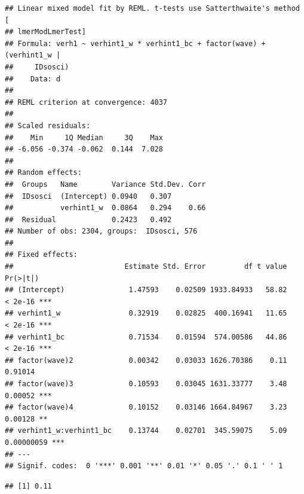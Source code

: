 \documentclass[
]{book}
\newenvironment{Shaded}{\begin{snugshade}}{\end{snugshade}}
\newcommand{\CommentTok}[1]{\textcolor[rgb]{0.56,0.35,0.01}{\textit{#1}}}
\newcommand{\DecValTok}[1]{\textcolor[rgb]{0.00,0.00,0.81}{#1}}
\newcommand{\KeywordTok}[1]{\textcolor[rgb]{0.13,0.29,0.53}{\textbf{#1}}}
\newcommand{\NormalTok}[1]{#1}
\newcommand{\OperatorTok}[1]{\textcolor[rgb]{0.81,0.36,0.00}{\textbf{#1}}}
\newcommand{\StringTok}[1]{\textcolor[rgb]{0.31,0.60,0.02}{#1}}
\begin{document}
\begin{verbatim}
## Linear mixed model fit by REML. t-tests use Satterthwaite's method [
## lmerModLmerTest]
## Formula: verh1 ~ verhint1_w * verhint1_bc + factor(wave) + (verhint1_w |  
##     IDsosci)
##    Data: d
## 
## REML criterion at convergence: 4037
## 
## Scaled residuals: 
##    Min     1Q Median     3Q    Max 
## -6.056 -0.374 -0.062  0.144  7.028 
## 
## Random effects:
##  Groups   Name        Variance Std.Dev. Corr
##  IDsosci  (Intercept) 0.0940   0.307        
##           verhint1_w  0.0864   0.294    0.66
##  Residual             0.2423   0.492        
## Number of obs: 2304, groups:  IDsosci, 576
## 
## Fixed effects:
##                          Estimate Std. Error         df t value   Pr(>|t|)    
## (Intercept)               1.47593    0.02509 1933.84933   58.82    < 2e-16 ***
## verhint1_w                0.32919    0.02825  400.16941   11.65    < 2e-16 ***
## verhint1_bc               0.71534    0.01594  574.00586   44.86    < 2e-16 ***
## factor(wave)2             0.00342    0.03033 1626.70386    0.11    0.91014    
## factor(wave)3             0.10593    0.03045 1631.33777    3.48    0.00052 ***
## factor(wave)4             0.10152    0.03146 1664.84967    3.23    0.00128 ** 
## verhint1_w:verhint1_bc    0.13744    0.02701  345.59075    5.09 0.00000059 ***
## ---
## Signif. codes:  0 '***' 0.001 '**' 0.01 '*' 0.05 '.' 0.1 ' ' 1
\end{verbatim}

\begin{Shaded}
\end{Shaded}

\begin{verbatim}
## [1] 0.11
\end{verbatim}
\end{document}
